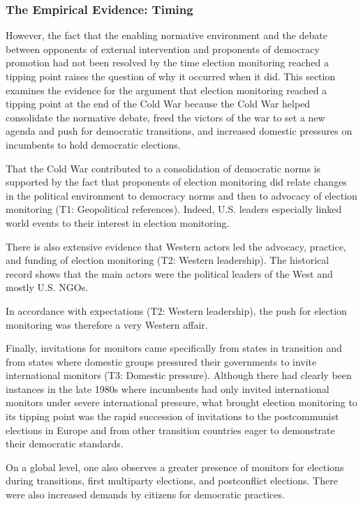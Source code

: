 \subsubsection{The Empirical Evidence: Timing}
However, the fact that the enabling normative environment and the debate between opponents of external intervention and proponents of democracy promotion had not been resolved by the time election monitoring reached a tipping point raises the question of why it occurred when it did. This section examines the evidence for the argument that election monitoring reached a tipping point at the end of the Cold War because the Cold War helped consolidate the normative debate, freed the victors of the war to set a new agenda and push for democratic transitions, and increased domestic pressures on incumbents to hold democratic elections.

That the Cold War contributed to a consolidation of democratic norms is supported by the fact that proponents of election monitoring did relate changes in the political environment to democracy norms and then to advocacy of election monitoring (T1: Geopolitical references). Indeed, U.S. leaders especially linked world events to their interest in election monitoring.

There is also extensive evidence that Western actors led the advocacy, practice, and funding of election monitoring (T2: Western leadership). The historical record shows that the main actors were the political leaders of the West and mostly U.S. NGOs.

In accordance with expectations (T2: Western leadership), the push for election monitoring was therefore a very Western affair.

Finally, invitations for monitors came specifically from states in transition and from states where domestic groups pressured their governments to invite international monitors (T3: Domestic pressure). Although there had clearly been instances in the late 1980s where incumbents had only invited international monitors under severe international pressure, what brought election monitoring to its tipping point was the rapid succession of invitations to the postcommunist elections in Europe and from other transition countries eager to demonstrate their democratic standards.

On a global level, one also observes a greater presence of monitors for elections during transitions, first multiparty elections, and postconflict elections. There were also increased demands by citizens for democratic practices.

